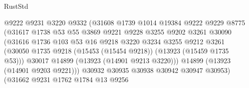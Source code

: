 \begin{lexlean}{RustStd}
\begin{coremodule}
                                    @9222
                                    @9231
                                    @3220
                                    @9332
                                    (@31608
                                      @1739
                                      @1014
                                      @19384
                                      @9222
                                      @9229
                                      @8775
                                      (@31617
                                        @1738
                                        @53
                                        @55
                                        @3869
                                        @9221
                                        @9228
                                        @3255
                                        @9202
                                        @3261
                                        @30090
                                        (@31616
                                          @1736
                                          @103
                                          @53
                                          @16
                                          @9218
                                          @3220
                                          @3234
                                          @3255
                                          @9212
                                          @3261
                                          (@30050
                                            @1735
                                            @9218
                                            (@15453 (@15454 @9218))
                                            (@13923 (@15459 @1735 @53)))
                                          @30017
                                          @14899
                                          (@13923 (@14901 @9213 @3220)))
                                        @14899
                                        (@13923 (@14901 @9203 @9221)))
                                      @30932
                                      @30935
                                      @30938
                                      @30942
                                      @30947
                                      @30953)
                                    (@31662
                                      @9231
                                      @1762
                                      @1784
                                      @13
                                      @9256

\end{coremodule}
\end{lexlean}
